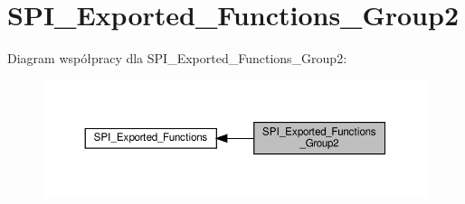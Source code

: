 \hypertarget{group___s_p_i___exported___functions___group2}{}\section{S\+P\+I\+\_\+\+Exported\+\_\+\+Functions\+\_\+\+Group2}
\label{group___s_p_i___exported___functions___group2}
Diagram współpracy dla S\+P\+I\+\_\+\+Exported\+\_\+\+Functions\+\_\+\+Group2\+:\nopagebreak
\begin{figure}[H]
\begin{center}
\leavevmode
\includegraphics[width=350pt]{group___s_p_i___exported___functions___group2}
\end{center}
\end{figure}
